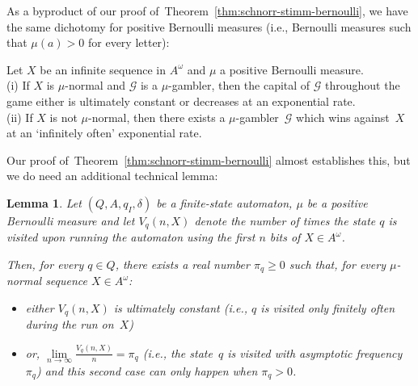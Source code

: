 \documentclass[11pt]{article}
\newtheorem{lemma}{Lemma}
\newcommand{\G}{\mathcal{G}}
\begin{document}
As a byproduct of our proof of~Theorem~\ref{thm:schnorr-stimm-bernoulli}, we have the same dichotomy for positive Bernoulli measures (i.e., Bernoulli measures such that $\mu(a)>0$ for every letter):

\begin{theorem} \label{thm:schnorr-stimm-dicho-bernoulli}
\label{thm:bernoullidichotomy}
Let $X$ be an infinite sequence in $A^\omega$ and $\mu$ a positive Bernoulli measure. \\
(i) If $X$ is $\mu$-normal and $\G$ is a $\mu$-gambler, then the capital of $\G$ throughout the game either is ultimately constant or decreases at an exponential rate.\\
(ii) If $X$ is not $\mu$-normal, then there exists a $\mu$-gambler~$\G$ which wins against~$X$ at an `infinitely often' exponential rate.
\end{theorem}

Our proof of~Theorem~\ref{thm:schnorr-stimm-bernoulli} almost establishes this, but we do need an additional technical lemma:

\begin{lemma}
\label{lem:ergodiconnormal}
	Let $(Q,A,q_I,\delta)$ be a finite-state automaton, $\mu$ be a positive Bernoulli measure and let $V_q(n,X)$ denote the number of times the state $q$ is visited upon running the automaton using the first $n$ bits of $X \in A^\omega$. 
	
	Then, for every $q \in Q$, there exists a real number $\pi_q \geq 0$ such that, for every $\mu$-normal sequence $X \in A^\omega$:
	\begin{itemize}
	\item either $V_q(n,X)$ is ultimately constant (i.e., $q$ is visited only finitely often during the run on~$X$)
	\item or, $	\lim\limits_{n \to \infty} \frac{V_q(n,X)}{n} = \pi_q$ (i.e., the state~$q$ is visited with asymptotic frequency $\pi_q$) and this second case can only happen when $\pi_q>0$.
		\end{itemize} 
	
	
	
\end{lemma}
\end{document}
